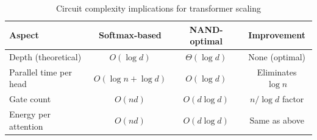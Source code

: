 \begin{table}[ht]






\centering






\caption{Circuit complexity implications for transformer scaling}






\begin{tabular}{lccc}






\hline






\textbf{Aspect} & \textbf{Softmax-based} & \textbf{NAND-optimal} & \textbf{Improvement} \\






\hline






Depth (theoretical) & $O(\log d)$ & $\Theta(\log d)$ & None (optimal) \\






Parallel time per head & $O(\log n + \log d)$ & $O(\log d)$ & Eliminates $\log n$ \\






Gate count & $O(nd)$ & $O(d \log d)$ & $n/\log d$ factor \\






Energy per attention & $O(nd)$ & $O(d \log d)$ & Same as above \\






\hline






\end{tabular}






\label{tab:complexity-comparison}






\end{table}













